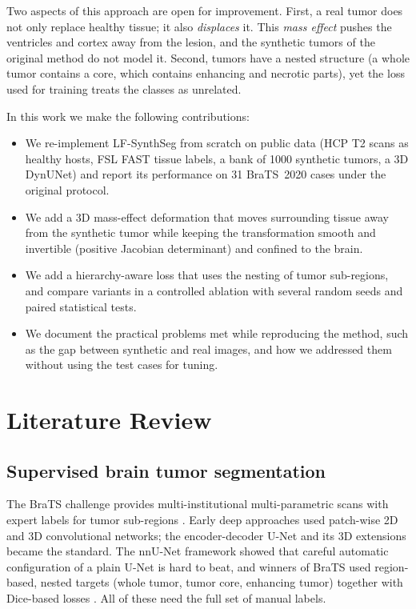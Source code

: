 \documentclass[10pt,a4paper,twocolumn,twoside]{article}
\begin{document}
Two aspects of this approach are open for improvement. First, a real
tumor does not only replace healthy tissue; it also \emph{displaces} it. This
\emph{mass effect} pushes the ventricles and cortex away from the lesion, and
the synthetic tumors of the original method do not model it. Second, tumors
have a nested structure (a whole tumor contains a core, which contains
enhancing and necrotic parts), yet the loss used for training treats
the classes as unrelated.

In this work we make the following contributions:
\begin{itemize}
\item We re-implement LF-SynthSeg from scratch on public data (HCP T2 scans
as healthy hosts, FSL FAST tissue labels, a bank of 1000 synthetic tumors, a
3D DynUNet) and report its performance on 31 BraTS~2020 cases under the
original protocol.
\item We add a 3D mass-effect deformation that moves surrounding tissue away
from the synthetic tumor while keeping the transformation smooth and
invertible (positive Jacobian determinant) and confined to the brain.
\item We add a hierarchy-aware loss that uses the nesting of tumor
sub-regions, and compare variants in a controlled ablation with several
random seeds and paired statistical tests.
\item We document the practical problems met while reproducing the method,
such as the gap between synthetic and real images, and how we addressed
them without using the test cases for tuning.
\end{itemize}

\section{Literature Review}
\subsection{Supervised brain tumor segmentation}
The BraTS challenge provides multi-institutional multi-parametric scans with
expert labels for tumor sub-regions \cite{menze,bakas}. Early deep
approaches used patch-wise 2D and 3D convolutional networks; the encoder-decoder
U-Net \cite{unet} and its 3D extensions became the standard. The nnU-Net
framework \cite{nnunet} showed that careful automatic configuration of a
plain U-Net is hard to beat, and winners of BraTS used region-based, nested
targets (whole tumor, tumor core, enhancing tumor) together with Dice-based
losses \cite{myronenko,vnet}. All of these need the full set of manual
labels.
\end{document}
